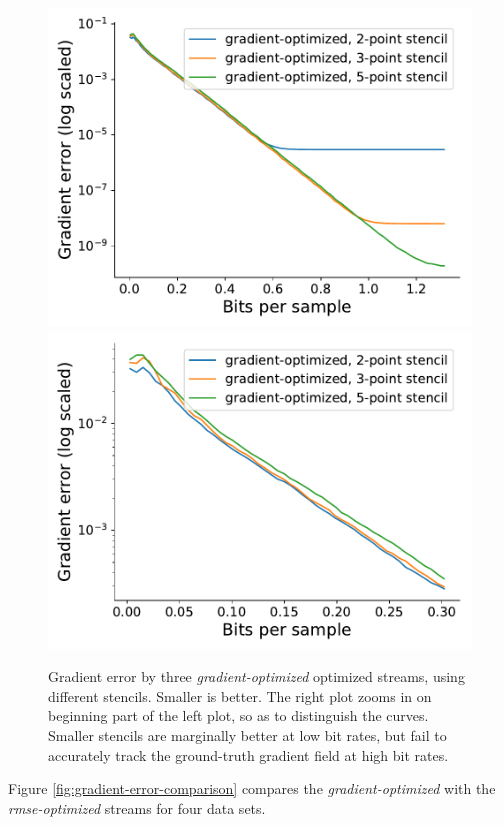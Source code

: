 \begin{figure}
	\centering
	{\includegraphics[width=0.48\linewidth]{img/gradient-laplacian/sine-gradient-stencils-full.pdf}}
	{\includegraphics[width=0.48\linewidth]{img/gradient-laplacian/sine-gradient-stencils-cutoff.pdf}}
	\caption{Gradient error by three \emph{gradient-optimized} optimized	streams, using different
	 stencils. Smaller is better. The right plot zooms in on beginning part of the left plot, so as to distinguish the curves. Smaller stencils are marginally better at low bit rates, but fail to accurately track the ground-truth gradient field at high bit rates.}
  \label{fig:gradient-error-comparison-stencils}
\end{figure}
Figure \ref{fig:gradient-error-comparison} compares the \emph{gradient-optimized} with the
\emph{rmse-optimized} streams for four data sets.

